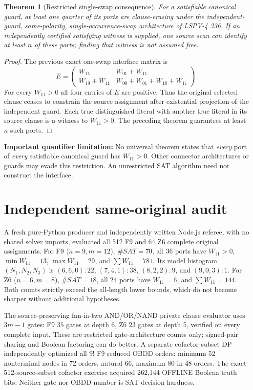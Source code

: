 \documentclass[11pt]{article}
\newtheorem{theorem}{Theorem}
\begin{document}
\begin{theorem}[Restricted single-swap consequence]
For a satisfiable canonical guard, at least one quarter of its ports are clause-erasing under the \emph{independent-guard, same-polarity, single-occurrence-swap architecture} of LSPV-4 336. If an independently certified satisfying witness is supplied, one source scan can identify at least $n$ of these ports; finding that witness is not assumed free.
\end{theorem}
\begin{proof}
The previous exact one-swap interface matrix is
\[
E=\begin{pmatrix}W_{11}&W_{01}+W_{11}\\
W_{10}+W_{11}&W_{00}+W_{01}+W_{10}+W_{11}\end{pmatrix}.
\]
For every $W_{11}>0$ all four entries of $E$ are positive. Thus the original selected clause ceases to constrain the source assignment after existential projection of the independent guard. Each true distinguished literal with another true literal in its source clause is a witness to $W_{11}>0$. The preceding theorem guarantees at least $n$ such ports.
\end{proof}
\noindent\textbf{Important quantifier limitation:} No universal theorem states that \emph{every} port of \emph{every} satisfiable canonical guard has $W_{11}>0$. Other connector architectures or guards may evade this restriction. An unrestricted SAT algorithm need not construct the interface.

\section{Independent same-original audit}
A fresh pure-Python producer and independently written Node.js referee, with no shared solver imports, evaluated all 512 F9 and 64 Z6 complete original assignments. For F9 ($n=9,m=12$), $\#SAT=70$, all 36 ports have $W_{11}>0$, $\min W_{11}=13$, $\max W_{11}=29$, and $\sum W_{11}=781$. Its model histogram $(N_1,N_2,N_3)$ is $(6,6,0):22$, $(7,4,1):38$, $(8,2,2):9$, and $(9,0,3):1$. For Z6 ($n=6,m=8$), $\#SAT=18$, all 24 ports have $W_{11}=6$, and $\sum W_{11}=144$. Both counts strictly exceed the all-length lower bounds, which do not become sharper without additional hypotheses.

The source-preserving fan-in-two AND/OR/NAND private clause evaluator uses $3m-1$ gates: F9 $35$ gates at depth 6, Z6 $23$ gates at depth 5, verified on every complete input. These are restricted gate-architecture counts only; signed-pair sharing and Boolean factoring can do better. A separate cofactor-subset DP independently optimized all $9!$ F9 reduced OBDD orders: minimum $52$ nonterminal nodes in 72 orders, natural $66$, maximum $80$ in 48 orders. The exact 512-source-subset cofactor exercise acquired 262,144 OFFLINE Boolean truth bits. Neither gate nor OBDD number is SAT decision hardness.
\end{document}
